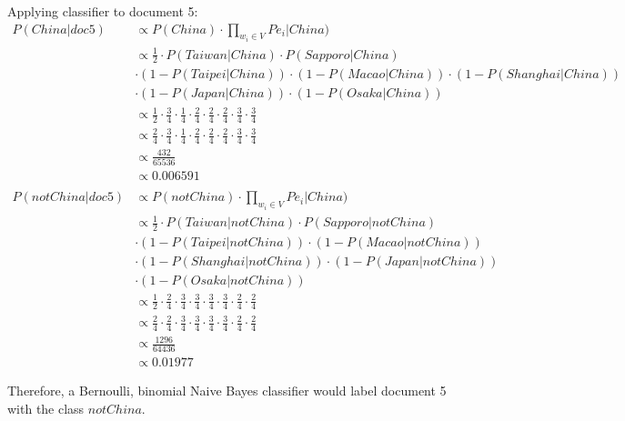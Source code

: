 \documentclass{article}
\begin{document}
Applying classifier to document 5:
\begin{align}
	P(China|doc5) & \propto P(China) \cdot \prod_{w_i \in V} {Pe_i|China)} \\
	& \propto \frac{1}{2} \cdot P(Taiwan|China) \cdot P(Sapporo|China) \nonumber \\
	& \cdot (1 - P(Taipei|China)) \cdot (1 - P(Macao|China)) \cdot (1 - P(Shanghai|China)) \nonumber \\
	& \cdot (1 - P(Japan|China)) \cdot (1 - P(Osaka|China)) \\
	& \propto \frac{1}{2} \cdot \frac{3}{4} \cdot \frac{1}{4}
	\cdot \frac{2}{4} \cdot \frac{2}{4} \cdot \frac{2}{4}
	\cdot \frac{3}{4} \cdot \frac{3}{4} \\
	& \propto \frac{2}{4} \cdot \frac{3}{4} \cdot \frac{1}{4}
	\cdot \frac{2}{4} \cdot \frac{2}{4} \cdot \frac{2}{4}
	\cdot \frac{3}{4} \cdot \frac{3}{4} \\
	& \propto \frac{432}{65536} \\
	& \propto 0.006591 \\
	& \nonumber \\
	P(notChina|doc5) & \propto P(notChina) \cdot \prod_{w_i \in V} {Pe_i|China)} \\
	& \propto \frac{1}{2} \cdot P(Taiwan|notChina) \cdot P(Sapporo|notChina) \nonumber \\
	& \cdot (1 - P(Taipei|notChina)) \cdot (1 - P(Macao|notChina)) \nonumber \\
	& \cdot (1 - P(Shanghai|notChina)) \cdot (1 - P(Japan|notChina)) \nonumber \\
	& \cdot (1 - P(Osaka|notChina)) \\	
	& \propto \frac{1}{2} \cdot \frac{2}{4} \cdot \frac{3}{4} \cdot \frac{3}{4} \cdot \frac{3}{4} \cdot \frac{3}{4} \cdot \frac{2}{4} \cdot \frac{2}{4} \\
	& \propto \frac{2}{4} \cdot \frac{2}{4} \cdot \frac{3}{4} \cdot \frac{3}{4} \cdot \frac{3}{4} \cdot \frac{3}{4} \cdot \frac{2}{4} \cdot \frac{2}{4} \\
	& \propto \frac{1296}{64436} \\
	& \propto0.01977
\end{align}

Therefore, a Bernoulli, binomial Naive Bayes classifier would label document 5 with the class $notChina$.
\end{document}
